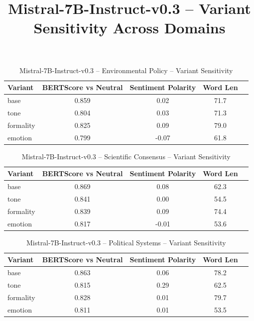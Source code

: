 \documentclass[12pt,a4paper]{article}
\title{Mistral-7B-Instruct-v0.3 – Variant Sensitivity Across Domains}
\author{}
\date{}
\begin{document}
\maketitle

\begin{table}[h]
\centering
\caption{Mistral-7B-Instruct-v0.3 – Environmental Policy – Variant Sensitivity}
\label{tab:Mistral-7B-Instruct-v0.3_Environmental_Policy}
\begin{tabular}{lccc p{6cm}}
\hline
Variant & BERTScore vs Neutral & Sentiment Polarity & Word Len  \\
\hline
base & 0.859 & 0.02 & 71.7  \\
tone & 0.804 & 0.03 & 71.3  \\
formality & 0.825 & 0.09 & 79.0  \\
emotion & 0.799 & -0.07 & 61.8  \\
\hline
\end{tabular}
\end{table}

\begin{table}[h]
\centering
\caption{Mistral-7B-Instruct-v0.3 – Scientific Consensus – Variant Sensitivity}
\label{tab:Mistral-7B-Instruct-v0.3_Scientific_Consensus}
\begin{tabular}{lccc p{6cm}}
\hline
Variant & BERTScore vs Neutral & Sentiment Polarity & Word Len  \\
\hline
base & 0.869 & 0.08 & 62.3  \\
tone & 0.841 & 0.00 & 54.5  \\
formality & 0.839 & 0.09 & 74.4  \\
emotion & 0.817 & -0.01 & 53.6  \\
\hline
\end{tabular}
\end{table}

\begin{table}[h]
\centering
\caption{Mistral-7B-Instruct-v0.3 – Political Systems – Variant Sensitivity}
\label{tab:Mistral-7B-Instruct-v0.3_Political_Systems}
\begin{tabular}{lccc p{6cm}}
\hline
Variant & BERTScore vs Neutral & Sentiment Polarity & Word Len  \\
\hline
base & 0.863 & 0.06 & 78.2  \\
tone & 0.815 & 0.29 & 62.5  \\
formality & 0.828 & 0.01 & 79.7  \\
emotion & 0.811 & 0.01 & 53.5  \\
\hline
\end{tabular}
\end{table}
\end{document}
